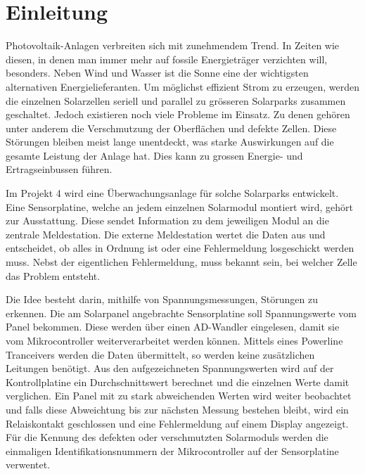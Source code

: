 \section{Einleitung}


Photovoltaik-Anlagen verbreiten sich mit zunehmendem Trend. In Zeiten wie diesen, in denen man immer mehr auf fossile Energieträger verzichten will, besonders. Neben Wind und Wasser ist die Sonne eine der wichtigsten alternativen Energielieferanten. Um möglichst effizient Strom zu erzeugen, werden die einzelnen Solarzellen seriell und parallel zu grösseren Solarparks zusammen geschaltet. Jedoch existieren noch viele Probleme im Einsatz. Zu denen gehören unter anderem die Verschmutzung der Oberflächen und defekte Zellen. Diese Störungen bleiben meist lange unentdeckt, was starke Auswirkungen auf die gesamte Leistung der Anlage hat. Dies kann zu grossen Energie- und Ertragseinbussen führen.


Im Projekt 4 wird eine Überwachungsanlage für solche Solarparks entwickelt. Eine Sensorplatine, welche an jedem einzelnen Solarmodul montiert wird, gehört zur Ausstattung. Diese sendet Information zu dem jeweiligen Modul an die zentrale Meldestation. Die externe Meldestation wertet die Daten aus und entscheidet, ob alles in Ordnung ist oder eine Fehlermeldung losgeschickt werden muss. Nebst der eigentlichen Fehlermeldung, muss bekannt sein, bei welcher Zelle das Problem entsteht.



Die Idee besteht darin, mithilfe von Spannungsmessungen, Störungen zu erkennen. Die am Solarpanel angebrachte Sensorplatine soll  Spannungswerte vom Panel bekommen. Diese werden über einen AD-Wandler eingelesen, damit sie vom Mikrocontroller weiterverarbeitet werden können. Mittels eines Powerline Tranceivers werden die Daten übermittelt, so werden keine zusätzlichen Leitungen benötigt. Aus den aufgezeichneten Spannungswerten wird auf der Kontrollplatine ein Durchschnittswert berechnet und die einzelnen Werte damit verglichen. Ein Panel mit zu stark abweichenden Werten wird weiter beobachtet und falls diese Abweichtung bis zur nächsten Messung bestehen bleibt, wird ein Relaiskontakt geschlossen und eine Fehlermeldung auf einem Display angezeigt. Für die Kennung des defekten oder verschmutzten Solarmoduls  werden die einmaligen Identifikationsnummern der Mikrocontroller auf der Sensorplatine verwentet.
